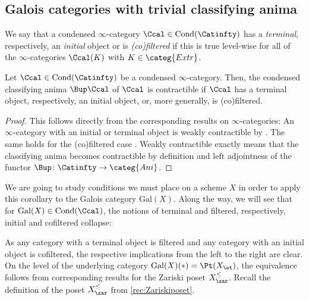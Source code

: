 \documentclass[leqno]{article}
\renewcommand{\Gal}{\mathrm{Gal}}
\newcommand{\Ani}{\categ{Ani}}
\DeclareMathOperator{\Cond}{Cond}
\newcommand{\CondCat}{\Cond(\Catinfty)}
\newcommand{\Extr}{\categ{Extr}}
\newcommand{\Zpos}[1]{{#1}_{\zar}^{\leq}}
\begin{document}
\subsection{Galois categories with trivial classifying anima}
\begin{definition}
We say that a condensed $\infty$-category $\Ccal\in \CondCat$ 
has a \textit{terminal}, respectively, an \textit{initial} object or is \textit{(co)filtered}
if this is true level-wise for all of the $\infty$-categories $\Ccal(K)$ with $K\in \Extr$.
\end{definition}
\begin{corollary}
Let $\Ccal \in \CondCat$ be a condensed $\infty$-category.
Then, the condensed classifying anima $\Bup\Ccal$ of $\Ccal$ is contractible if $\Ccal$ has a terminal object, respectively, an initial object, or, more generally, is (co)filtered.
\end{corollary}
\begin{proof}
This follows directly from the corresponding results on $\infty$-categories:
An $\infty$-category with an initial or terminal object is weakly contractible by \cite[\href{https://kerodon.net/tag/02P2}{Corollary 02P2}]{Kerodon}. The same holds for the (co)filtered case \cite[\href{https://kerodon.net/tag/02PH}{Proposition 02PH}]{Kerodon}.
Weakly contractible exactly means that the classifying anima becomes contractible by definition \cite[\href{https://kerodon.net/tag/00UA}{Definition 00UA}]{Kerodon} and left adjointness of the functor $\Bup\colon \Catinfty \rightarrow \Ani$.
\end{proof}
%
We are going to study conditions we must place on a scheme $X$ in order to apply this corollary to the Galois category $\Gal(X)$.
Along the way, we will see that for $\Gal(X)\in \Cond(\Ccal)$, the notions of terminal and filtered, respectively, initial and cofiltered collapse:
%
As any category with a terminal object is filtered and any category with an initial object is cofiltered, the respective implications from the left to the right are clear.
On the level of the underlying category $\Gal(X)(\ast)=\Pt(X_{\et})$, the equivalence follows from corresponding results for the Zariski poset $ \Zpos{X}$. Recall the definition of the poset $ \Zpos{X} $ from \cref{rec:Zariskiposet}.
%
\end{document}
